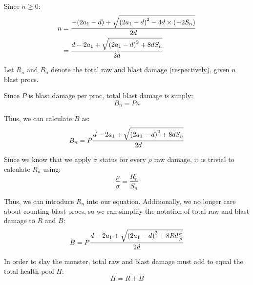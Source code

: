\documentclass{article}
\begin{document}
Since $n \ge 0$:
\begin{align}
    n &= \frac{- \parens*{2 a_1 - d} + \sqrt{\parens*{2 a_1 - d}^2 - 4 d \times \parens*{- 2 S_n}}}{2 d} \\
      &= \frac{d - 2 a_1 + \sqrt{\parens*{2 a_1 - d}^2 + 8 d S_n}}{2 d}
\end{align}

Let $R_n$ and $B_n$ denote the total raw and blast damage (respectively), given $n$ blast procs.

Since $P$ is blast damage per proc, total blast damage is simply:
\begin{equation}
    B_n = Pn
\end{equation}

Thus, we can calculate $B$ as:
\begin{equation}
    B_n = P \frac{d - 2 a_1 + \sqrt{\parens*{2 a_1 - d}^2 + 8 d S_n}}{2 d}
\end{equation}

Since we know that we apply $\sigma$ status for every $\rho$ raw damage, it is trivial to calculate $R_n$ using:
\begin{equation}
    \frac{\rho}{\sigma} = \frac{R_n}{S_n}
    \label{eq:rs_ratio}
\end{equation}

Thus, we can introduce $R_n$ into our equation. Additionally, we no longer care about counting blast procs, so we can simplify the notation of total raw and blast damage to $R$ and $B$:
\begin{equation}
    B = P \frac{d - 2 a_1 + \sqrt{\parens*{2 a_1 - d}^2 + 8 R d \frac{\sigma}{\rho} }}{2 d}
\end{equation}

In order to slay the monster, total raw and blast damage must add to equal the total health pool $H$:
\begin{equation}
    H = R + B
    \label{eq:h_eq_r_b}
\end{equation}
\end{document}

